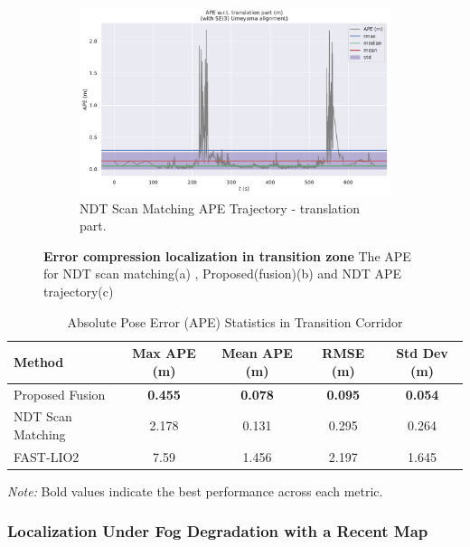 \begin{figure}[H]
\begin{subfigure}[t]{0.49\textwidth}
{		}
		\label{fig:ape-error-unmapped-proposed}
	\end{subfigure}
    \begin{subfigure}[t]{0.49\textwidth}
    	\includegraphics[page=2 ,width=\linewidth]{images/unmappedzone_error_ndt2.pdf}
    	\caption{ NDT Scan Matching APE Trajectory  - translation part.
    	}
    	\label{fig:ape-error-trajectory-unmapped-proposed}
    \end{subfigure}
	\caption[Error compression  localization in transition zone]{
	\textbf{Error compression  localization in transition zone} The APE for NDT scan matching(a) , Proposed(fusion)(b) and NDT APE trajectory(c)}
	\label{fig:ape-error-unmapped}
\end{figure}

\begin{table}[H]
	\centering
	\caption{Absolute Pose Error (APE) Statistics in Transition Corridor}
	\label{tab:ape-unmapped-comparison}
	\begin{tabular}{lcccc}
		\toprule
		\textbf{Method} & \textbf{Max APE (m)} & \textbf{Mean APE (m)} & \textbf{RMSE (m)} & \textbf{Std Dev (m)} \\
		\midrule
		Proposed Fusion   &\textbf{ 0.455} & \textbf{0.078} & \textbf{0.095} &\textbf{ 0.054} \\
		NDT Scan Matching & 2.178 & 0.131 & 0.295 & 0.264 \\
		FAST-LIO2   & 7.59 & 1.456  & 2.197 & 1.645 \\
		
		
		\bottomrule
	\end{tabular}
{\footnotesize \textit{Note:} Bold values indicate the best performance across each metric.}
\end{table}


\subsubsection{Localization Under Fog Degradation with a Recent Map}

